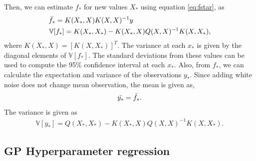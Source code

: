 \documentclass[conference]{IEEEtran}
\begin{document}
Then, we can estimate $f_*$ for new values $X_*$ using equation \ref{eq:fstar}, as
\begin{equation}
\begin{aligned}
    &\Bar{f_*} = K(X_*,X)K(X,X)^{-1}y\\
    &\mathbb{V}[f_*] = K(X_*,X_*) - K(X_*,X)Q(X,X)^{-1}K(X,X_*),
\end{aligned}
\end{equation}
where $K(X_*,X) = \left[K(X,X_*)\right]^T$.
The variance at each $x_*$ is given by the diagonal elements of $\mathbb{V}[f_*]$. 
The standard deviations from these values can be used to compute the 95\% confidence interval at each $x_*$.
Also, from $f_*$, we can calculate the expectation and variance of the observations $y_*$. Since adding white noise does not change mean observation, the mean is given as,
\begin{equation}
\begin{aligned}
    \Bar{y_*} = \Bar{f_*}.
\end{aligned}
\end{equation}
The variance is given as
\begin{equation}
\begin{aligned}
	\mathbb{V}[y_*] = Q(X_*,X_*) - K(X_*,X)Q(X,X)^{-1}K(X,X_*).
\end{aligned}
\end{equation}


\subsection{GP Hyperparameter regression}
\end{document}

